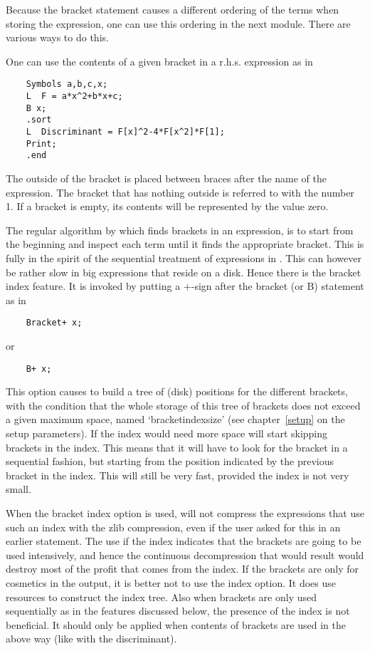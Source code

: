 Because the bracket statement causes a different ordering of the terms when 
storing the expression, one can use this ordering in the next module. There 
are various ways to do this.

One can use the contents of a given bracket in a r.h.s. expression as in
\begin{verbatim}
    Symbols a,b,c,x;
    L  F = a*x^2+b*x+c;
    B x;
    .sort
    L  Discriminant = F[x]^2-4*F[x^2]*F[1];
    Print;
    .end
\end{verbatim}
The outside of the bracket is placed between braces after the 
name of the expression. The bracket that has nothing outside is referred to 
with the number 1. If a bracket is empty, its contents will be represented 
by the value zero.

The regular algorithm by which \FORM{} finds brackets in an expression, is 
to start from the beginning and inspect each term until it finds the 
appropriate bracket. This is fully in the spirit of the sequential 
treatment of expressions in \FORM{}. This can however be rather 
slow in big 
expressions that reside on a disk. Hence there is the bracket 
index 
feature. It is invoked by putting a $+$-sign after the bracket (or B) 
statement as in 
\begin{verbatim}
    Bracket+ x;
\end{verbatim}
or
\begin{verbatim}
    B+ x;
\end{verbatim}
This option causes \FORM{} to build a tree of (disk) positions for the 
different brackets, with the condition that the whole storage of this tree 
of brackets does not exceed a given maximum space, named 
`bracketindexsize' 
(see chapter~\ref{setup} on the setup parameters). 
If the index would need more space \FORM{} will start 
skipping brackets in the index. This means that it will have to look for 
the bracket in a sequential fashion, but starting from the position 
indicated by the previous bracket in the index. This will still be very 
fast, provided the index is not very small.

When the bracket index option is used, \FORM will not compress the 
expressions that use such an index with the zlib compression, even if the 
user asked for this in an earlier statement. The use if the index indicates 
that the brackets are going to be used intensively, and hence the 
continuous decompression that would result would destroy most of the profit 
that comes from the index. If the brackets are only for cosmetics in the 
output, it is better not to use the index option. It does use resources to 
construct the index tree. Also when 
brackets are only used sequentially as in the features discussed below, the 
presence of the index is not beneficial. It should only be applied when 
contents of brackets are used in the above way (like with the 
discriminant).

